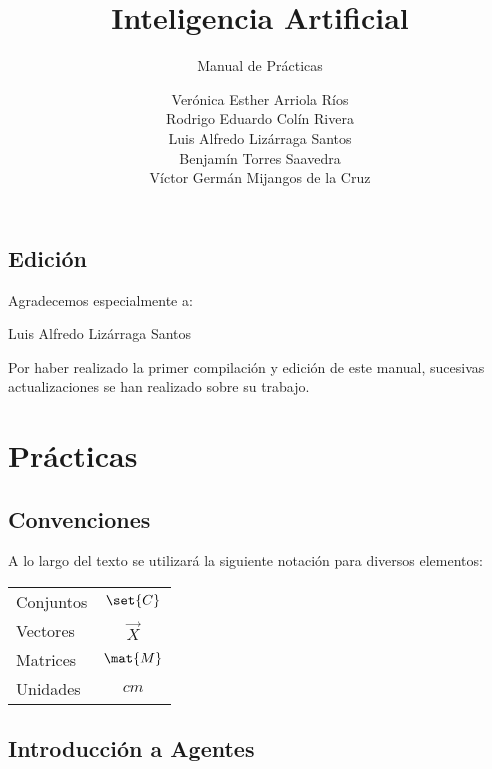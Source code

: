 \documentclass[12pt,openany]{book}
\title{Inteligencia Artificial}
\subtitle{Manual de Prácticas}
\author{
  Verónica Esther Arriola Ríos \\
  Rodrigo Eduardo Colín Rivera \\
  Luis Alfredo Lizárraga Santos \\
  Benjamín Torres Saavedra \\
  Víctor Germán Mijangos de la Cruz \\
}
\begin{document}
\maketitle

\chapter*{Edición}


Agradecemos especialmente a:

\begin{center}
 Luis Alfredo Lizárraga Santos
\end{center}
 
Por haber realizado la primer compilación y edición de este manual, sucesivas actualizaciones se han realizado sobre su trabajo.



\frontmatter %
\tableofcontents
\clearemptydoublepage %


\mainmatter  %



\part{Prácticas}


\chapter*{Convenciones}

A lo largo del texto se utilizará la siguiente notación para diversos elementos:
\begin{longtable}{lc}
 Conjuntos   &   $\set{C}$ \\
 Vectores    &   $\vec{X}$ \\
 Matrices    &   $\mat{M}$ \\
 Unidades    &   $\unit{cm}$
\end{longtable}



\chapter{Introducción a Agentes}
\end{document}
